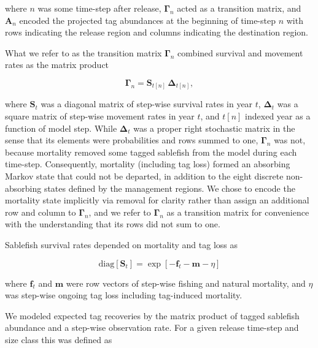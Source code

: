 \documentclass{article}
\begin{document}
\noindent where $n$ was some time-step after release, $\boldsymbol{\Gamma}_n$ acted as a transition matrix, and $\boldsymbol{A}_n$ encoded the projected tag abundances at the beginning of time-step $n$ with rows indicating the release region and columns indicating the destination region. 

What we refer to as the transition matrix $\boldsymbol{\Gamma}_n$ combined survival and movement rates as the matrix product

\begin{equation}
    \label{eq:transition}
    \boldsymbol{\Gamma}_{n} = \boldsymbol{S}_{t[n]} \, \boldsymbol{\Delta}_{t[n]},
\end{equation}

\noindent where $\boldsymbol{S}_t$ was a diagonal matrix of step-wise survival rates in year $t$, $\boldsymbol{\Delta}_t$ was a square matrix of step-wise movement rates in year $t$, and $t[n]$ indexed year as a function of model step. While $\boldsymbol{\Delta}_t$ was a proper right stochastic matrix in the sense that its elements were probabilities and rows summed to one, $\boldsymbol{\Gamma}_n$ was not, because mortality removed some tagged sablefish from the model during each time-step. Consequently, mortality (including tag loss) formed an absorbing Markov state that could not be departed, in addition to the eight discrete non-absorbing states defined by the management regions. We chose to encode the mortality state implicitly via removal for clarity rather than assign an additional row and column to $\boldsymbol{\Gamma}_n$, and we refer to $\boldsymbol{\Gamma}_n$ as a transition matrix for convenience with the understanding that its rows did not sum to one.

Sablefish survival rates depended on mortality and tag loss as

\begin{equation}
  \label{eq:survival}
  \mathrm{diag} \! \left[\boldsymbol{S}_{t}\right] = \exp\!{\left[-\boldsymbol{f}_t - \boldsymbol{m} - \eta \right]}
\end{equation}

\noindent where $\boldsymbol{f}_t$ and $\boldsymbol{m}$ were row vectors of step-wise fishing and natural mortality, and $\eta$ was step-wise ongoing tag loss including tag-induced mortality. 

We modeled expected tag recoveries by the matrix product of tagged sablefish abundance and a step-wise observation rate. For a given release time-step and size class this was defined as
\end{document}
